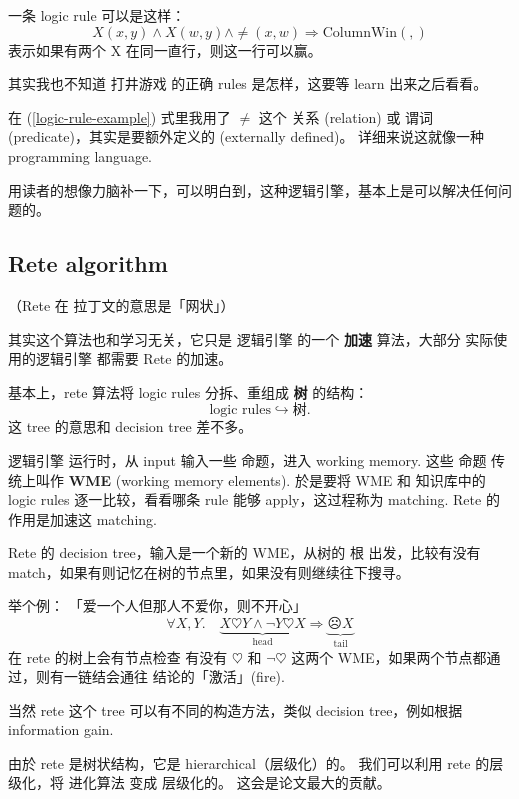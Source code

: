 一条 logic rule 可以是这样：
\begin{equation}
\label{logic-rule-example}
X(x, y) \wedge X(w, y) \wedge \neq(x,w) \Rightarrow \text{ColumnWin}(,)
\end{equation}
表示如果有两个 X 在同一直行，则这一行可以赢。

其实我也不知道 打井游戏 的正确 rules 是怎样，这要等 learn 出来之后看看。 

在 (\ref{logic-rule-example}) 式里我用了 $\neq$ 这个 关系 (relation) 或 谓词 (predicate)，其实是要额外定义的 (externally defined)。 详细来说这就像一种 programming language.

用读者的想像力脑补一下，可以明白到，这种逻辑引擎，基本上是可以解决任何问题的。 

\subsection{Rete algorithm}

（Rete 在 拉丁文的意思是「网状」）

其实这个算法也和学习无关，它只是 逻辑引擎 的一个 \textbf{加速} 算法，大部分 实际使用的逻辑引擎 都需要 Rete 的加速。

基本上，rete 算法将 logic rules 分拆、重组成 \textbf{树} 的结构：
\begin{equation}
\boxed{\text{logic rules}} \hookrightarrow \boxed{\text{树}} .
\end{equation}
这 tree 的意思和 decision tree 差不多。

逻辑引擎 运行时，从 input 输入一些 命题，进入 working memory.  这些 命题 传统上叫作 \textbf{WME} (working memory elements).  於是要将 WME 和 知识库中的 logic rules 逐一比较，看看哪条 rule 能够 apply，这过程称为 matching.  Rete 的作用是加速这 matching.

Rete 的 decision tree，输入是一个新的 WME，从树的 根 出发，比较有没有 match，如果有则记忆在树的节点里，如果没有则继续往下搜寻。

举个例： 「爱一个人但那人不爱你，则不开心」
\begin{equation}
\forall X, Y.  \quad \underbrace{X \heartsuit Y \wedge \neg Y \heartsuit X}_{\mbox{head}} \Rightarrow \underbrace{\frownie X}_{\mbox{tail}}
\end{equation}
在 rete 的树上会有节点检查 有没有 $\heartsuit$ 和 $\neg \heartsuit$ 这两个 WME，如果两个节点都通过，则有一链结会通往 结论的「激活」(fire). 

当然 rete 这个 tree 可以有不同的构造方法，类似 decision tree，例如根据 information gain. 

由於 rete 是树状结构，它是 hierarchical（层级化）的。 我们可以利用 rete 的层级化，将 进化算法 变成 层级化的。 这会是论文最大的贡献。

\printbibliography

